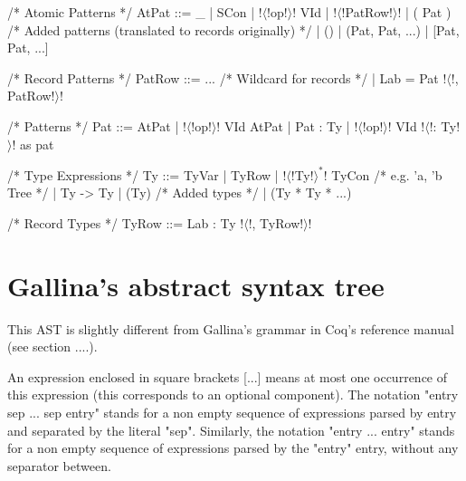 \documentclass[a4paper,11pt]{article}
\begin{document}
\begin{grm}
/* Atomic Patterns */
AtPat ::= _ 
        | SCon
        | !$\langle$!op!$\rangle$! VId 
        | { !$\langle$!PatRow!$\rangle$! }
        | ( Pat )
        /* Added patterns (translated to records originally) */
        | ()
        | (Pat, Pat, ...)
        | [Pat, Pat, ...]

/* Record Patterns */
PatRow ::= ... /* Wildcard for records */
         | Lab = Pat !$\langle$!, PatRow!$\rangle$!

/* Patterns */
Pat ::= AtPat
      | !$\langle$!op!$\rangle$! VId AtPat
      | Pat : Ty
      | !$\langle$!op!$\rangle$! VId !$\langle$!: Ty!$\rangle$! as pat

/* Type Expressions */
Ty ::= TyVar
     | { TyRow }
     | !$\langle$!Ty!$\rangle^*$! TyCon /* e.g. 'a, 'b Tree */
     | Ty -> Ty
     | (Ty)
     /* Added types */
     | (Ty * Ty * ...)

/* Record Types */
TyRow ::= Lab : Ty !$\langle$!, TyRow!$\rangle$!
\end{grm}

\section{Gallina's abstract syntax tree}

This AST is slightly different from Gallina's grammar in Coq's reference manual
(see section ....).

An expression enclosed in square brackets [...] means at
most one occurrence of this expression (this corresponds to an optional
component). The notation "entry sep ... sep entry" stands for a non empty sequence
of expressions parsed by entry and separated by the literal "sep". Similarly,
the notation "entry ... entry" stands for a non empty sequence of expressions
parsed by the "entry" entry, without any separator between.
\end{document}
